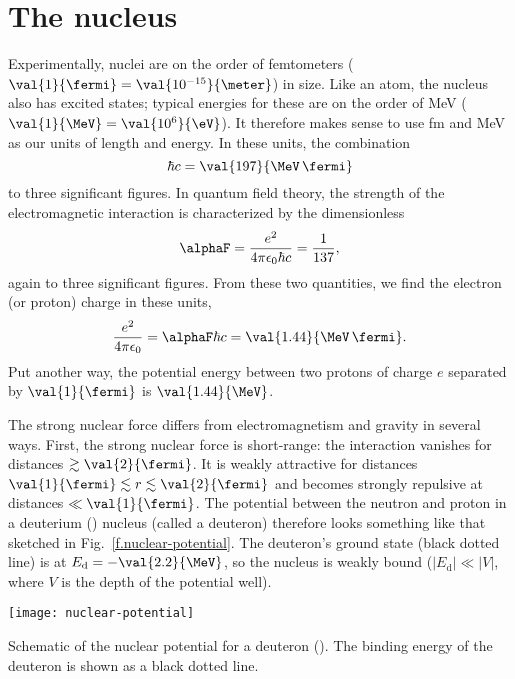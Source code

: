 
\section{The nucleus}

Experimentally, nuclei are on the order of femtometers ($\val{1}{\fermi} = \val{10^{-15}}{\meter}$) in size. Like an atom, the nucleus also has excited states; typical energies for these are on the order of MeV ($\val{1}{\MeV} = \val{10^{6}}{\eV}$).  It therefore makes sense to use fm and MeV as our units of length and energy. In these units, the combination
\[	\hbar c = \val{197}{\MeV\,\fermi} \]
to three significant figures. In quantum field theory, the strength of the electromagnetic interaction is characterized by the dimensionless 
\[	\alphaF = \frac{e^{2}}{4\pi\epsilon_{0}\hbar c} = \frac{1}{137}, \]
again to three significant figures. From these two quantities, we find the electron (or proton) charge in these units,
\[
	\frac{e^{2}}{4\pi\epsilon_{0}} = \alphaF\hbar c = \val{1.44}{\MeV\,\fermi}.
\]
Put another way, the potential energy between two protons of charge $e$ separated by $\val{1}{\fermi}$ is $\val{1.44}{\MeV}$.

The strong nuclear force differs from electromagnetism and gravity in several ways. First, the strong nuclear force is short-range: the interaction vanishes for distances $\gtrsim\val{2}{\fermi}$. It is weakly attractive for distances $\val{1}{\fermi}\lesssim r\lesssim\val{2}{\fermi}$ and becomes strongly repulsive at distances $\ll\val{1}{\fermi}$. The potential between the neutron and proton in a deuterium (\hydrogen[2]) nucleus (called a deuteron) therefore looks something like that sketched in Fig.~\ref{f.nuclear-potential}. The deuteron's ground state (black dotted line) is at $E_{\mathrm{d}} = -\val{2.2}{\MeV}$, so the nucleus is weakly bound ($|E_{\mathrm{d}}| \ll |V|$, where $V$ is the depth of the potential well).

\begin{marginfigure}[-8\baselineskip]
\texttt{[image: nuclear-potential]}
\caption[Schematic of the nuclear potential]{\label{f.nuclear-potential}Schematic of the nuclear potential for a deuteron (\hydrogen[2]). The binding energy of the deuteron is shown as a black dotted line.}
\end{marginfigure}


